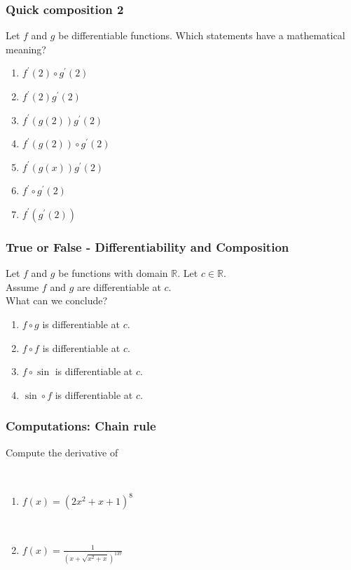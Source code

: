 \documentclass[14pt]{beamer}
\newcommand {\DS} [1] {${\displaystyle #1}$}
\newcommand {\R}{\mathbb{R}}
\newcommand{\azul}[1]{{\color{blue} #1}}
\begin{document}
\begin{frame}
\frametitle{Quick composition 2}

 Let $f$ and $g$ be differentiable functions. Which statements have a mathematical meaning?

	\vfill
\begin {enumerate}
\item $f^{\prime}(2)\circ g^{\prime}(2)$
\item $f^{\prime}(2)g^{\prime}(2)$
\item $f^{\prime}(g(2)) g^{\prime}(2)$
\item $f^{\prime}(g(2))\circ g^{\prime}(2)$
\item $f^{\prime}(g(x)) g^{\prime}(2)$
\item $f^{\prime}\circ g^{\prime}(2)$
\item $f^{\prime}(g^{\prime}(2))$
\end{enumerate}

\end{frame}

\begin{frame}[t]
\frametitle{True or False - Differentiability and Composition}

Let $f$ and $g$ be functions with domain $\R$.  Let $c \in \R$. \\
Assume $f$ and $g$ are differentiable at $c$.  \\
What can we conclude?

\vfill

\begin{enumerate}
	
	\item $f \circ g$ \; is \azul{differentiable} at $c$.
\vfill
	\item $f \circ f$ \; is \azul{differentiable} at $c$.
\vfill
	\item $f \circ \sin$ \; is \azul{differentiable} at $c$.
\vfill
	\item $\sin \circ f$ \; is \azul{differentiable} at $c$.
\vfill
\end{enumerate}
 
\end{frame}

\begin{frame}[t]
\frametitle{Computations: Chain rule}

Compute the derivative of 

\

\begin{enumerate}
	\item  \DS{f(x) = \left( 2x^2+x+1 \right)^{8} }


\
	
	\item \DS{f(x) = \frac{1}{\left( x + \sqrt{x^2+x}  \right)^{137}}  }

\end{enumerate}

\end{frame}
\end{document}

